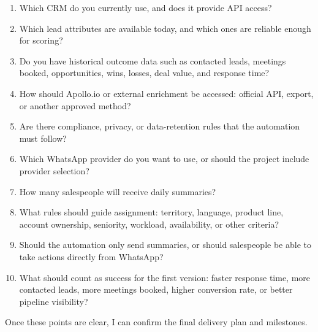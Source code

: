\documentclass[11pt,a4paper]{article}
\begin{document}
\begin{enumerate}
\item Which CRM do you currently use, and does it provide API access?
\item Which lead attributes are available today, and which ones are reliable enough for scoring?
\item Do you have historical outcome data such as contacted leads, meetings booked, opportunities, wins, losses, deal value, and response time?
\item How should Apollo.io or external enrichment be accessed: official API, export, or another approved method?
\item Are there compliance, privacy, or data-retention rules that the automation must follow?
\item Which WhatsApp provider do you want to use, or should the project include provider selection?
\item How many salespeople will receive daily summaries?
\item What rules should guide assignment: territory, language, product line, account ownership, seniority, workload, availability, or other criteria?
\item Should the automation only send summaries, or should salespeople be able to take actions directly from WhatsApp?
\item What should count as success for the first version: faster response time, more contacted leads, more meetings booked, higher conversion rate, or better pipeline visibility?
\end{enumerate}

Once these points are clear, I can confirm the final delivery plan and milestones.\par
\end{document}
